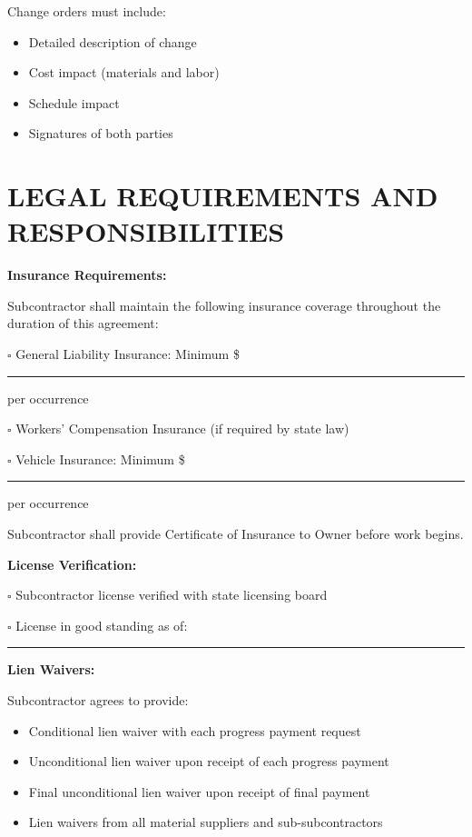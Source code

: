 \documentclass[11pt,letterpaper]{article}
\begin{document}
Change orders must include:
\begin{itemize}[leftmargin=0.5in]
\item Detailed description of change
\item Cost impact (materials and labor)
\item Schedule impact
\item Signatures of both parties
\end{itemize}

\newpage

\section*{LEGAL REQUIREMENTS AND RESPONSIBILITIES}

\textbf{Insurance Requirements:}

Subcontractor shall maintain the following insurance coverage throughout the duration of this agreement:

$\square$ General Liability Insurance: Minimum \$ \rule{3cm}{0.4pt} per occurrence

$\square$ Workers' Compensation Insurance (if required by state law)

$\square$ Vehicle Insurance: Minimum \$ \rule{3cm}{0.4pt} per occurrence

Subcontractor shall provide Certificate of Insurance to Owner before work begins.

\vspace{6pt}

\textbf{License Verification:}

$\square$ Subcontractor license verified with state licensing board

$\square$ License in good standing as of: \rule{4cm}{0.4pt}

\vspace{6pt}

\textbf{Lien Waivers:}

Subcontractor agrees to provide:
\begin{itemize}[leftmargin=0.5in]
\item Conditional lien waiver with each progress payment request
\item Unconditional lien waiver upon receipt of each progress payment
\item Final unconditional lien waiver upon receipt of final payment
\item Lien waivers from all material suppliers and sub-subcontractors
\end{itemize}
\end{document}

